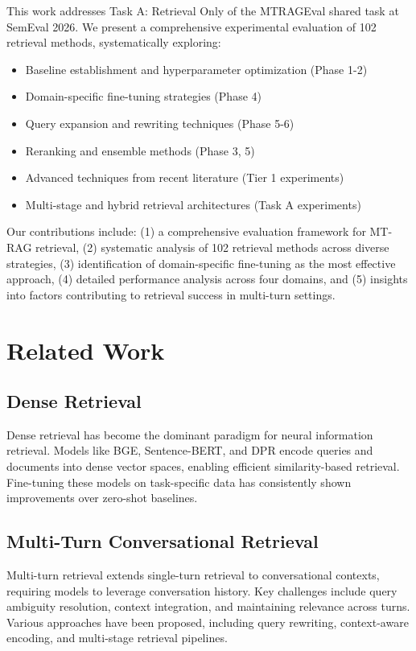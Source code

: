 \documentclass[11pt]{article}
\begin{document}
This work addresses Task A: Retrieval Only of the MTRAGEval shared task at SemEval 2026. We present a comprehensive experimental evaluation of 102 retrieval methods, systematically exploring:

\begin{itemize}
    \item Baseline establishment and hyperparameter optimization (Phase 1-2)
    \item Domain-specific fine-tuning strategies (Phase 4)
    \item Query expansion and rewriting techniques (Phase 5-6)
    \item Reranking and ensemble methods (Phase 3, 5)
    \item Advanced techniques from recent literature (Tier 1 experiments)
    \item Multi-stage and hybrid retrieval architectures (Task A experiments)
\end{itemize}

Our contributions include: (1) a comprehensive evaluation framework for MT-RAG retrieval, (2) systematic analysis of 102 retrieval methods across diverse strategies, (3) identification of domain-specific fine-tuning as the most effective approach, (4) detailed performance analysis across four domains, and (5) insights into factors contributing to retrieval success in multi-turn settings.

\section{Related Work}

\subsection{Dense Retrieval}

Dense retrieval has become the dominant paradigm for neural information retrieval. Models like BGE, Sentence-BERT, and DPR encode queries and documents into dense vector spaces, enabling efficient similarity-based retrieval. Fine-tuning these models on task-specific data has consistently shown improvements over zero-shot baselines.

\subsection{Multi-Turn Conversational Retrieval}

Multi-turn retrieval extends single-turn retrieval to conversational contexts, requiring models to leverage conversation history. Key challenges include query ambiguity resolution, context integration, and maintaining relevance across turns. Various approaches have been proposed, including query rewriting, context-aware encoding, and multi-stage retrieval pipelines.
\end{document}
